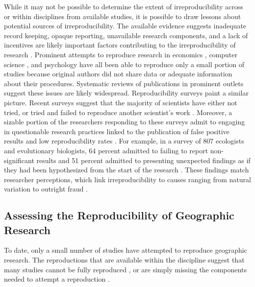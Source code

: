 \documentclass[]{interact}
\theoremstyle{plain}%
\theoremstyle{definition}
\theoremstyle{remark}
\begin{document}
While it may not be possible to determine the extent of irreproducibility across or within disciplines from available studies, it is possible to draw lessons about potential sources of irreproducibility.
The available evidence suggests inadequate record keeping, opaque reporting, unavailable research components, and a lack of incentives are likely important factors contributing to the irreproducibility of research \citep{NASEM2019}. 
Prominent attempts to reproduce research in economics \citep{chang2015economics}, computer science \citep{moraila2014measuring}, and psychology \citep{open2015estimating} have all been able to reproduce only a small portion of studies because original authors did not share data or adequate information about their procedures. 
Systematic reviews of publications in prominent outlets \citep{byrne_2017,stodden2018empirical} suggest these issues are likely widespread. 
Reproducibility surveys paint a similar picture. 
Recent surveys suggest that the majority of scientists have either not tried, or tried and failed to reproduce another scientist's work \citep{baker20161, boulbes2018survey}. 
Moreover, a sizable portion of the researchers responding to these surveys admit to engaging in questionable research practices linked to the publication of false positive results and low reproducibility rates \citep{fanelli2009many, fraser2018questionable}.
For example, in a survey of 807 ecologists and evolutionary biologists, 64 percent admitted to failing to report non-significant results and 51 percent admitted to presenting unexpected findings as if they had been hypothesized from the start of the research \citep{fraser2018questionable}.  
These findings match researcher perceptions, which link irreproducibility to causes ranging from natural variation to outright fraud \citep{ranstam2000fraud, anderson2007normative, baker20161}. 


\subsection*{Assessing the Reproducibility of Geographic Research}
To date, only a small number of studies have attempted to reproduce geographic research.
The reproductions that are available within the discipline suggest that many studies cannot be fully reproduced \citep{Kedron2021ssrn, nust2018, ostermann2021}, or are simply missing the components needed to attempt a reproduction \citep{Kedron_VijayanRP, konkol2019, ostermann2021}.
\end{document}
